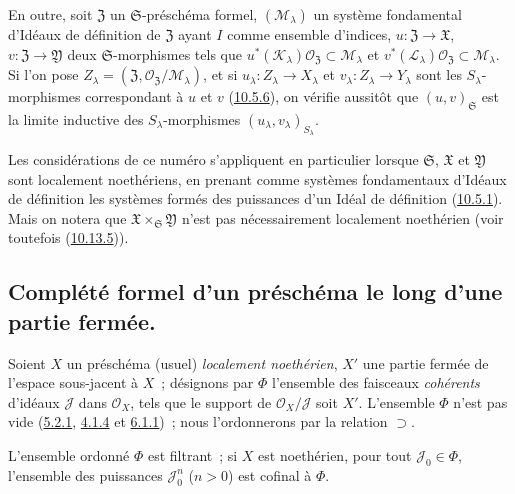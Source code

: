 \begin{env}[10.7.4]
En outre, soit $\mathfrak{Z}$ un $\mathfrak{S}$-préschéma formel,
$(\mathscr{M}_\lambda)$ un système fondamental d'Idéaux de définition de
$\mathfrak{Z}$ ayant $I$ comme ensemble d'indices,
$u:\mathfrak{Z}\to\mathfrak{X}$,
$v:\mathfrak{Z}\to\mathfrak{Y}$ deux $\mathfrak{S}$-morphismes tels que
$u^*(\mathscr{K}_\lambda)\mathscr{O}_{\mathfrak{Z}}
\subset\mathscr{M}_\lambda$ et
$v^*(\mathscr{L}_\lambda)\mathscr{O}_{\mathfrak{Z}}
\subset\mathscr{M}_\lambda$. Si l'on pose
$Z_\lambda=(\mathfrak{Z},
\mathscr{O}_{\mathfrak{Z}}/\mathscr{M}_\lambda)$, et si
$u_\lambda:Z_\lambda\to X_\lambda$ et
$v_\lambda:Z_\lambda\to Y_\lambda$ sont les $S_\lambda$-morphismes
correspondant à $u$ et $v$ (\hyperref[I.10.5.6-fr]{10.5.6}), on vérifie
aussitôt que $(u,v)_{\mathfrak{S}}$ est la limite inductive des
$S_\lambda$-morphismes $(u_\lambda,v_\lambda)_{S_\lambda}$.

Les considérations de ce numéro s'appliquent en particulier lorsque
$\mathfrak{S}$, $\mathfrak{X}$ et $\mathfrak{Y}$ sont localement
noethériens, en prenant comme systèmes fondamentaux d'Idéaux de définition
les systèmes formés des puissances d'un Idéal de définition
(\hyperref[I.10.5.1-fr]{10.5.1}). Mais on notera que
$\mathfrak{X}\times_{\mathfrak{S}}\mathfrak{Y}$ n'est pas nécessairement
localement noethérien (voir toutefois
(\hyperref[I.10.13.5-fr]{10.13.5})).
\end{env}

\subsection{Complété formel d'un préschéma le long d'une partie fermée.}
\label{subsection:I.10.8-fr}

\begin{env}[10.8.1]
\label{I.10.8.1-fr}
Soient $X$ un préschéma (usuel) \emph{localement noethérien}, $X'$ une partie
fermée de l'espace sous-jacent à $X$~; désignons par $\Phi$ l'ensemble des
faisceaux \emph{cohérents} d'idéaux $\mathscr{J}$ dans $\mathscr{O}_X$, tels que
le support de $\mathscr{O}_X/\mathscr{J}$ soit $X'$. L'ensemble $\Phi$
n'est pas vide (\hyperref[I.5.2.1-fr]{5.2.1},
\hyperref[I.4.1.4-fr]{4.1.4} et
\hyperref[I.6.1.1-fr]{6.1.1})~; nous l'ordonnerons par la relation
$\supset$.
\end{env}

\begin{lemma}[10.8.2]
\label{I.10.8.2-fr}
L'ensemble ordonné $\Phi$ est filtrant~; si $X$ est noethérien, pour tout
$\mathscr{J}_0\in\Phi$, l'ensemble des puissances
$\mathscr{J}_0^n$ ($n>0$) est cofinal à $\Phi$.
\end{lemma}

